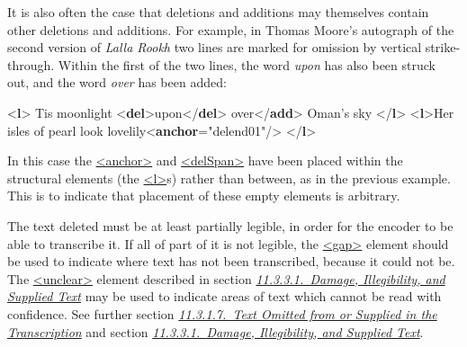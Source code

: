 It is also often the case that deletions and additions may themselves contain other deletions and additions. For example, in Thomas Moore's autograph of the second version of \textit{Lalla Rookh} two lines are marked for omission by vertical strike-through. Within the first of the two lines, the word \textit{upon} has also been struck out, and the word \textit{over} has been added: \par\bgroup{}\exampleFont \begin{shaded}\noindent\mbox{}{<\textbf{l}>}\mbox{}\newline 
{} Tis moonlight\mbox{}\newline 
{<\textbf{del}>}upon{</\textbf{del}>}\mbox{}\newline 
{}over{</\textbf{add}>} Oman's sky\mbox{}\newline 
{</\textbf{l}>}\mbox{}\newline 
{<\textbf{l}>}Her isles of pearl look lovelily{<\textbf{anchor}\hspace*{1em}{xml:id}="{delend01}"/>}\mbox{}\newline 
{</\textbf{l}>}\end{shaded}\egroup\par \noindent  In this case the \hyperref[TEI.anchor]{<anchor>} and \hyperref[TEI.delSpan]{<delSpan>} have been placed within the structural elements (the \hyperref[TEI.l]{<l>}s) rather than between, as in the previous example. This is to indicate that placement of these empty elements is arbitrary.\par
The text deleted must be at least partially legible, in order for the encoder to be able to transcribe it. If all of part of it is not legible, the \hyperref[TEI.gap]{<gap>} element should be used to indicate where text has not been transcribed, because it could not be. The \hyperref[TEI.unclear]{<unclear>} element described in section \textit{\hyperref[PHDA]{11.3.3.1.\ Damage, Illegibility, and Supplied Text}} may be used to indicate areas of text which cannot be read with confidence. See further section \textit{\hyperref[PHOM]{11.3.1.7.\ Text Omitted from or Supplied in the Transcription}} and section \textit{\hyperref[PHDA]{11.3.3.1.\ Damage, Illegibility, and Supplied Text}}.

